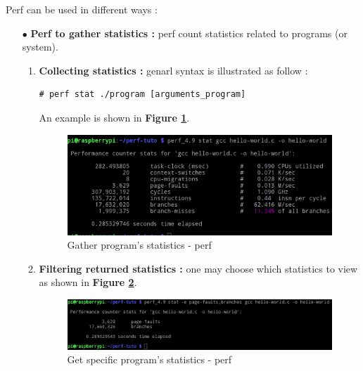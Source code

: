 \vspace{20px}
Perf can be used in different ways :
\begin{itemize}
	\item[$\bullet$] \textbf{Perf to gather statistics : } perf count statistics related to programs (or system).
	
		\begin{enumerate}
			\item \textbf{Collecting statistics : } genarl syntax is illustrated as follow :
	\begin{lstlisting}[style=BashInputStyle]
# perf stat ./program [arguments_program]
	\end{lstlisting}		
An example is shown in \textbf{Figure \ref{Gather program's statistics - perf}}.

					\begin{figure}[H]
						\centering
        				\includegraphics[scale=0.25]{img/solution/basic-statistics-using-perf.png}
        				\caption{Gather program's statistics - perf}
        				\label{Gather program's statistics - perf}
    				\end{figure}		
			
			
			\item \textbf{Filtering returned statistics : } one may choose which statistics to view as shown in \textbf{Figure \ref{Get specific program's statistics - perf}}.
					\begin{figure}[H]
						\centering
        				\includegraphics[scale=0.25]{img/solution/filter-statistics-using-perf.png}
        				\caption{Get specific program's statistics - perf}
        				\label{Get specific program's statistics - perf}
    				\end{figure}



\end{enumerate}
\end{itemize}

